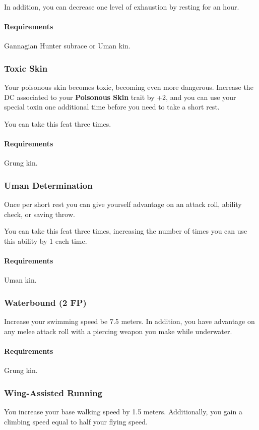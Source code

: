     In addition, you can decrease one level of exhaustion by resting for an hour.
    \paragraph{Requirements} Gannagian Hunter subrace or Uman kin.
\subsubsection{Toxic Skin} \label{feat::toxicskin}
    Your poisonous skin becomes toxic, becoming even more dangerous.
    Increase the DC associated to your \textbf{Poisonous Skin} trait by +2, and you can use your special toxin one additional time before you need to take a short rest.

    You can take this feat three times.
    \paragraph{Requirements} Grung kin.
\subsubsection{Uman Determination} \label{feat::umandetermination}
    Once per short rest you can give yourself advantage on an attack roll, ability check, or saving throw.

    You can take this feat three times, increasing the number of times you can use this ability by 1 each time.
    \paragraph{Requirements} Uman kin.
\subsubsection{Waterbound (2 FP)} \label{feat::waterbound}
    Increase your swimming speed be 7.5 meters.
    In addition, you have advantage on any melee attack roll with a piercing weapon you make while underwater.
    \paragraph{Requirements} Grung kin.
\subsubsection{Wing-Assisted Running} \label{feat::wingassistedrunning}
    You increase your base walking speed by 1.5 meters.
    Additionally, you gain a climbing speed equal to half your flying speed.
